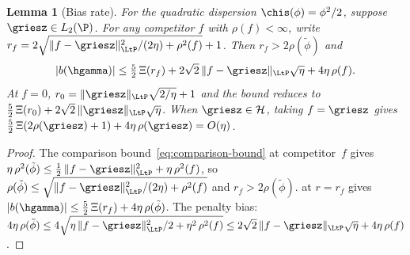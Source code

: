 \documentclass{article}
\newtheorem{lemma}[theorem]{Lemma}
\begin{document}
\begin{lemma}[Bias rate]
\label{lem:bias-rate}
For the quadratic dispersion
$\chis(\phi) = \phi^2/2$,
suppose $\griesz \in L_2(\P)$.
For any competitor $f$
with $\rho(f) < \infty$,
write
$r_f = 2\sqrt{\|f - \griesz\|_{\LtP}^2/(2\eta)
  + \rho^2(f)} + 1$.
Then $r_f > 2\rho(\tilde\phi)$ and
\begin{equation}
\label{eq:bias-rate}
|b(\hgamma)|
  \le \tfrac{5}{2}\,\Xi(r_f)
  + 2\sqrt{2}\,
  \|f - \griesz\|_{\LtP}\sqrt{\eta}
  + 4\eta\,\rho(f).
\end{equation}
At $f = 0$,
$r_0 = \|\griesz\|_{\LtP}\sqrt{2/\eta} + 1$
and the bound reduces to
$\tfrac{5}{2}\,\Xi(r_0)
  + 2\sqrt{2}\,\|\griesz\|_{\LtP}\sqrt{\eta}$.
When $\griesz \in \mathcal{H}$,
taking $f = \griesz$ gives
$\tfrac{5}{2}\,\Xi(2\rho(\griesz)+1)
  + 4\eta\,\rho(\griesz)
  = O(\eta)$.
\end{lemma}

\begin{proof}
The comparison bound~\eqref{eq:comparison-bound}
at competitor~$f$ gives
$\eta\,\rho^2(\tilde\phi)
  \le \tfrac{1}{2}\,\|f - \griesz\|_{\LtP}^2
  + \eta\,\rho^2(f)$,
so $\rho(\tilde\phi)
  \le \sqrt{\|f-\griesz\|_{\LtP}^2/(2\eta) + \rho^2(f)}$
and $r_f > 2\rho(\tilde\phi)$.
 at $r = r_f$ gives
$|b(\hgamma)|
  \le \tfrac{5}{2}\,\Xi(r_f)
  + 4\eta\,\rho(\tilde\phi)$.
The penalty bias:
$4\eta\,\rho(\tilde\phi)
  \le 4\sqrt{\eta\,\|f-\griesz\|_{\LtP}^2/2
    + \eta^2\,\rho^2(f)}
  \le 2\sqrt{2}\,\|f-\griesz\|_{\LtP}\sqrt{\eta}
  + 4\eta\,\rho(f)$.
\end{proof}
\end{document}
